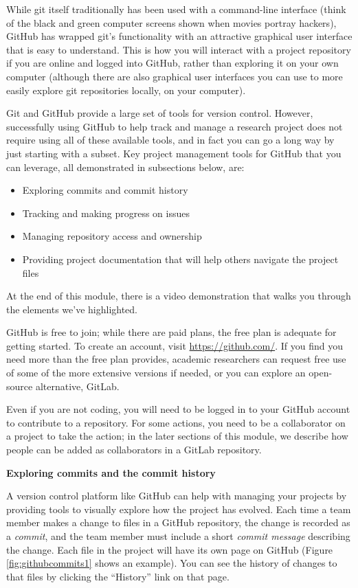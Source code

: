 \documentclass[]{tufte-book}
\providecommand{\tightlist}{%
  \setlength{\itemsep}{0pt}\setlength{\parskip}{0pt}}
\begin{document}
While git itself traditionally has been used with a command-line interface
(think of the black and green computer screens shown when movies portray
hackers), GitHub has wrapped git's functionality with an attractive graphical
user interface that is easy to understand. This is how you will interact with a
project repository if you are online and logged into GitHub, rather than
exploring it on your own computer (although there are also graphical user
interfaces you can use to more easily explore git repositories locally, on your
computer).

Git and GitHub provide a large set of tools for version control. However,
successfully using GitHub to help track and manage a research project does not
require using all of these available tools, and in fact you can go a long way by
just starting with a subset. Key project management tools for GitHub that you
can leverage, all demonstrated in subsections below, are:

\begin{itemize}
\tightlist
\item
  Exploring commits and commit history
\item
  Tracking and making progress on issues
\item
  Managing repository access and ownership
\item
  Providing project documentation that will help others navigate the project
  files
\end{itemize}

At the end of this module, there is a video demonstration that walks you through
the elements we've highlighted.

GitHub is free to join; while there are paid plans, the free plan is adequate
for getting started. To create an account, visit \url{https://github.com/}. If you
find you need more than the free plan provides, academic researchers can request
free use of some of the more extensive versions if needed, or you can explore an
open-source alternative, GitLab.

Even if you are not coding, you will need to be logged in to your GitHub account
to contribute to a repository. For some actions, you need to be a collaborator
on a project to take the action; in the later sections of this module, we
describe how people can be added as collaborators in a GitLab repository.

\textbf{Exploring commits and the commit history}

A version control platform like GitHub can help with managing your projects
by providing tools to visually explore how the project has evolved.
Each time a team member makes a change to files in a GitHub repository, the
change is recorded as a \emph{commit}, and the team member must include a short
\emph{commit message} describing the change. Each file in the project will have its
own page on GitHub (Figure \ref{fig:githubcommits1} shows an example). You can
see the history of changes to that files by clicking the ``History'' link on that
page.
\end{document}
